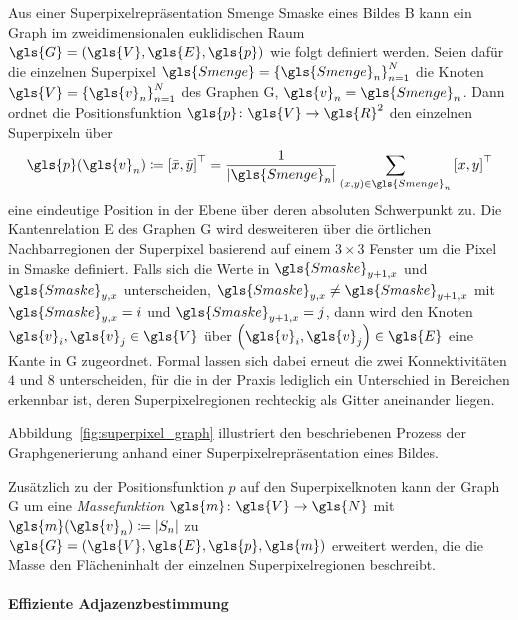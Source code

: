Aus einer Superpixelrepräsentation \gls{Smenge} \bzw{} \gls{Smaske} eines Bildes \gls{B} kann ein Graph im zweidimensionalen euklidischen Raum $\gls{G}=\left(\gls{V}, \gls{E}, \gls{p}\right)$ wie folgt definiert werden.
Seien dafür die einzelnen Superpixel $\gls{Smenge} = {\left\{\gls{Smenge}_n\right\}}_{n=1}^N$ die Knoten $\gls{V} = {\left\{\gls{v}_n\right\}}_{n=1}^N$ des Graphen \gls{G}, \dhe{} $\gls{v}_n = \gls{Smenge}_n$.
Dann ordnet die Positionsfunktion $\gls{p} \colon \gls{V} \to \gls{R}^2$ den einzelnen Superpixeln über
\begin{equation*}
  \gls{p}\left(\gls{v}_n\right) \coloneqq {\left[\bar{x}, \bar{y}\right]}^{\top} =  \frac{1}{\left|\gls{Smenge}_n\right|}\sum_{\left(x,y\right) \in \gls{Smenge}_n} {\left[x, y\right]}^{\top}
\end{equation*}
eine eindeutige Position in der Ebene über deren absoluten Schwerpunkt zu.
Die Kantenrelation \gls{E} des Graphen \gls{G} wird desweiteren über die örtlichen Nachbarregionen der Superpixel basierend auf einem $3 \times 3$ Fenster um die Pixel in \gls{Smaske} definiert.
Falls sich \bspw{} die Werte in $\gls{Smaske}_{y+1,x}$ und $\gls{Smaske}_{y,x}$ unterscheiden,
\dhe{} $\gls{Smaske}_{y,x} \neq \gls{Smaske}_{y+1,x}$ mit $\gls{Smaske}_{y,x} = i$ und $\gls{Smaske}_{y+1,x}=j$, dann wird den Knoten $\gls{v}_i, \gls{v}_j \in \gls{V}$ über $\left(\gls{v}_i, \gls{v}_j\right) \in \gls{E}$ eine Kante in \gls{G} zugeordnet.
Formal lassen sich dabei erneut die zwei Konnektivitäten $4$ und $8$ unterscheiden, für die in der Praxis lediglich ein Unterschied in Bereichen erkennbar ist, deren Superpixelregionen rechteckig als Gitter aneinander liegen.

Abbildung~\ref{fig:superpixel_graph} illustriert den beschriebenen Prozess der Graphgenerierung anhand einer Superpixelrepräsentation eines Bildes.

Zusätzlich zu der Positionsfunktion $p$ auf den Superpixelknoten kann der Graph \gls{G} um eine \emph{Massefunktion} $\gls{m} \colon \gls{V} \to \gls{N}$ mit $\gls{m}\left(\gls{v}_n\right) \coloneqq \left|S_n\right|$ zu $\gls{G} = \left(\gls{V}, \gls{E}, \gls{p}, \gls{m}\right)$ erweitert werden, die die Masse \bzw{} den Flächeninhalt der einzelnen Superpixelregionen beschreibt.

\paragraph{Effiziente Adjazenzbestimmung}
\label{adjazenzbestimmung_superpixel}


